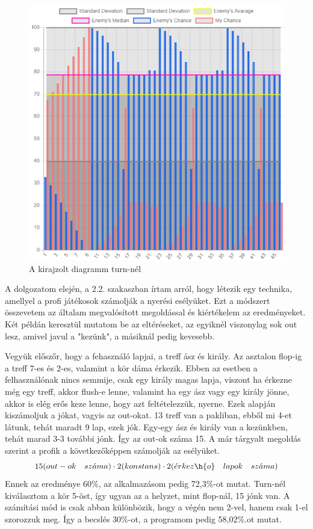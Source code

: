 \begin{figure}[h] 
	\centering
	\includegraphics[width=\textwidth]{images/chart-test.png}
	\caption{A kirajzolt diagramm turn-nél}
	\label{fig:chart-test}
\end{figure}

A dolgozatom elején, a 2.2. szakaszban írtam arról, hogy létezik egy technika, amellyel a profi játékosok számolják a nyerési esélyüket. Ezt a módszert összevetem az általam megvalósított megoldással és kiértékelem az eredményeket. Két példán keresztül mutatom be az eltéréseket, az egyiknél viszonylag sok out lesz, amivel javul a "kezünk", a másiknál pedig kevesebb.

Vegyük előszőr, hogy a fehasználó lapjai, a treff ász és király. Az asztalon flop-ig a treff 7-es és 2-es, valamint a kör dáma érkezik. Ebben az esetben a felhasználónak nincs semmije, csak egy király magas lapja, viszont ha érkezne még egy treff, akkor flush-e lenne, valamint ha egy ász vagy egy király jönne, akkor is elég erős keze lenne, hogy azt feltételezzük, nyerne. Ezek alapján kiszámoljuk a jókat, vagyis az out-okat. 13 treff van a pakliban, ebből mi 4-et látunk, tehát maradt 9 lap, ezek jók. Egy-egy ász és király van a kezünkben, tehát marad 3-3 további jónk. Így az out-ok száma 15. A már tárgyalt megoldás szerint a profik a következőképpen számolják az esélyüket. 
\[15(out-ok\quad sz\Acute{a}ma)\cdot2(konstans)\cdot2(\Acute{e}rkez\h{o}\quad lapok\quad sz\Acute{a}ma)\]
Ennek az eredménye 60\%, az alkalmazásom pedig 72,3\%-ot mutat. Turn-nél kiválasztom a kör 5-öst, így ugyan az a helyzet, mint flop-nál, 15 jónk van. A számítási mód is csak abban különbözik, hogy a végén nem 2-vel, hanem csak 1-el szorozzuk meg. Így a becslés 30\%-ot, a programom pedig 58,02\%.ot mutat.

